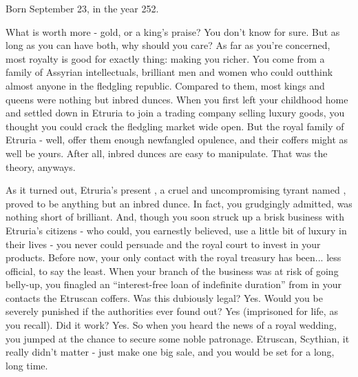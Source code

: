 \documentclass[char]{Kos}
\begin{document}
\name{\cMerchant{}}

Born September 23, in the year 252.

What is worth more - gold, or a king's praise? You don't know for sure. But as long as you can have both, why should you care? As far as you're concerned, most royalty is good for exactly thing: making you richer. You come from a family of Assyrian intellectuals, brilliant men and women who could outthink almost anyone in the fledgling republic. Compared to them, most kings and queens were nothing but inbred dunces. When you first left your childhood home and settled down in Etruria to join a trading company selling luxury goods, you thought you could crack the fledgling market wide open. But the royal family of Etruria - well, offer them enough newfangled opulence, and their coffers might as well be yours. After all, inbred dunces are easy to manipulate. That was the theory, anyways. 

As it turned out, Etruria's present \cEtruriaKing{\monarch}, a cruel and uncompromising tyrant named \cEtruriaKing{}, proved to be anything but an inbred dunce. In fact, you grudgingly admitted, \cEtruriaKing{\they} was nothing short of brilliant. And, though you soon struck up a brisk business with Etruria's citizens - who could, you earnestly believed, use a little bit of luxury in their lives - you never could persuade \cEtruriaKing{} and the royal court to invest in your products. Before now, your only contact with the royal treasury has been... less official, to say the least. When your branch of the business was at risk of going belly-up, you finagled an ``interest-free loan of indefinite duration'' from in your contacts the Etruscan coffers. Was this dubiously legal? Yes. Would you be severely punished if the authorities ever found out? Yes (imprisoned for life, as you recall). Did it work? Yes. So when you heard the news of a royal wedding, you jumped at the chance to secure some noble patronage. Etruscan, Scythian, it really didn't matter - just make one big sale, and you would be set for a long, long time.
\end{document}
